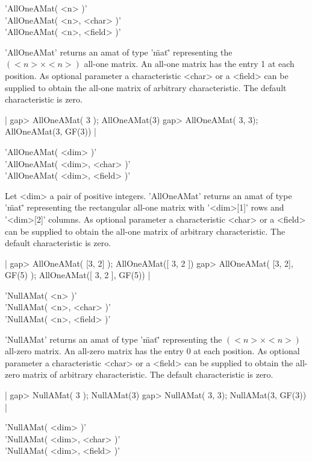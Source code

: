 
'AllOneAMat( <n> )'\\
'AllOneAMat( <n>, <char> )'\\
'AllOneAMat( <n>, <field> )'

'AllOneAMat' returns an amat of type '\"mat\"' representing
the $(<n>\times<n>)$ all-one matrix. An all-one matrix has 
the entry 1 at each position. As optional parameter 
a characteristic <char> or a <field> can be supplied to obtain 
the all-one matrix of arbitrary characteristic. 
The default characteristic is zero.

|    gap> AllOneAMat( 3 );
    AllOneAMat(3)
    gap> AllOneAMat( 3, 3);
    AllOneAMat(3, GF(3)) |

'AllOneAMat( <dim> )'\\
'AllOneAMat( <dim>, <char> )'\\
'AllOneAMat( <dim>, <field> )'

Let <dim> a pair of positive integers. 'AllOneAMat' returns
an amat of type '\"mat\"' representing the rectangular
all-one matrix with '<dim>[1]' rows and '<dim>[2]' columns. 
As optional parameter a characteristic <char> or a <field> 
can be supplied to obtain the all-one matrix of arbitrary 
characteristic. The default characteristic is zero. 

|    gap> AllOneAMat( [3, 2] );
    AllOneAMat([ 3, 2 ])
    gap> AllOneAMat( [3, 2], GF(5) ); 
    AllOneAMat([ 3, 2 ], GF(5)) |


'NullAMat( <n> )'\\
'NullAMat( <n>, <char> )'\\
'NullAMat( <n>, <field> )'

'NullAMat' returns an amat of type '\"mat\"' representing
the $(<n>\times<n>)$ all-zero matrix. An all-zero matrix has 
the entry 0 at each position. As optional parameter 
a characteristic <char> or a <field> can be supplied to obtain 
the all-zero matrix of arbitrary characteristic. 
The default characteristic is zero.

|    gap> NullAMat( 3 );
    NullAMat(3)
    gap> NullAMat( 3, 3);
    NullAMat(3, GF(3)) |

'NullAMat( <dim> )'\\
'NullAMat( <dim>, <char> )'\\
'NullAMat( <dim>, <field> )'

